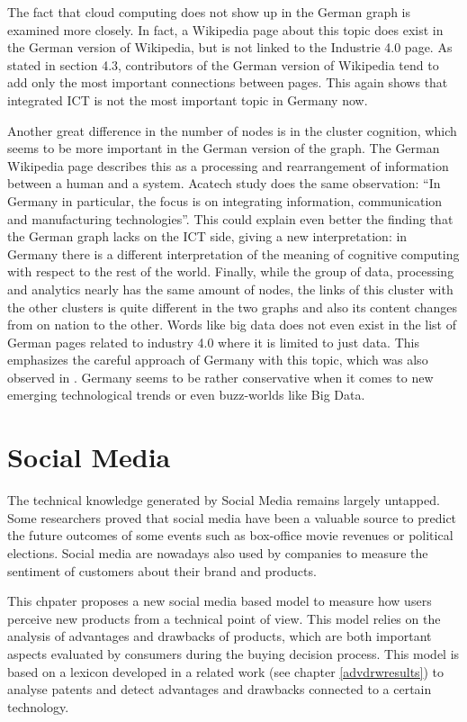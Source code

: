 \documentclass[]{book}
\begin{document}
The fact that cloud computing does not show up in the German graph is
examined more closely. In fact, a Wikipedia page about this topic does
exist in the German version of Wikipedia, but is not linked to the
Industrie 4.0 page. As stated in section 4.3, contributors of the German
version of Wikipedia tend to add only the most important connections
between pages. This again shows that integrated ICT is not the most
important topic in Germany now.

Another great difference in the number of nodes is in the cluster
cognition, which seems to be more important in the German version of the
graph. The German Wikipedia page describes this as a processing and
rearrangement of information between a human and a system. Acatech study
\citep{kagermann2006industry} does the same observation: ``In Germany in
particular, the focus is on integrating information, communication and
manufacturing technologies''. This could explain even better the finding
that the German graph lacks on the ICT side, giving a new
interpretation: in Germany there is a different interpretation of the
meaning of cognitive computing with respect to the rest of the world.
Finally, while the group of data, processing and analytics nearly has
the same amount of nodes, the links of this cluster with the other
clusters is quite different in the two graphs and also its content
changes from on nation to the other. Words like big data does not even
exist in the list of German pages related to industry 4.0 where it is
limited to just data. This emphasizes the careful approach of Germany
with this topic, which was also observed in \citep{wee2015industry}.
Germany seems to be rather conservative when it comes to new emerging
technological trends or even buzz-worlds like Big Data.

\chapter{Social Media}\label{social-media}

The technical knowledge generated by Social Media remains largely
untapped. Some researchers proved that social media have been a valuable
source to predict the future outcomes of some events such as box-office
movie revenues or political elections. Social media are nowadays also
used by companies to measure the sentiment of customers about their
brand and products.

This chpater proposes a new social media based model to measure how
users perceive new products from a technical point of view. This model
relies on the analysis of advantages and drawbacks of products, which
are both important aspects evaluated by consumers during the buying
decision process. This model is based on a lexicon developed in a
related work (see chapter \ref{advdrwresults}) to analyse patents and
detect advantages and drawbacks connected to a certain technology.
\end{document}
